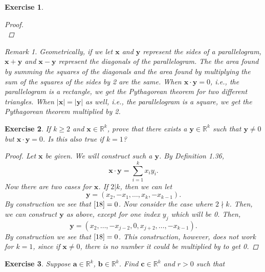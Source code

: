\documentclass[10pt,letterpaper]{amsart}
\newtheorem{exercise}{Exercise}[section]
\theoremstyle{definition}
\theoremstyle{remark}
\newtheorem*{remark}{Remark}
\numberwithin{equation}{exercise}
\begin{document}
\begin{multicols}{2}
\begin{exercise}
\begin{proof}
\begin{equation*}
      \end{equation*}
    \end{proof}
    \begin{remark}
      Geometrically, if we let $\mathbf{x}$ and $\mathbf{y}$ represent the sides of a parallelogram, $\mathbf{x}+\mathbf{y}$ and $\mathbf{x}-\mathbf{y}$ represent the diagonals of the parallelogram. The the area found by summing the squares of the diagonals and the area found by multiplying the sum of the squares of the sides by 2 are the same. When $\mathbf{x}\cdot\mathbf{y} = 0$, i.e., the parallelogram is a rectangle, we get the Pythagorean theorem for two different triangles. When $|\mathbf{x}| = |\mathbf{y}|$ as well, i.e., the parallelogram is a square, we get the Pythagorean theorem multiplied by 2.
    \end{remark}
  \end{exercise}
  \begin{exercise}\label{1.18}
    If $k \ge 2$ and $\mathbf{x} \in \mathbb{R}^k$, prove that there exists a $\mathbf{y} \in \mathbb{R}^k$ such that $\mathbf{y} \ne 0$ but $\mathbf{x}\cdot\mathbf{y} = 0$. Is this also true if $k = 1$?
    \begin{proof}
      Let $\mathbf{x}$ be given. We will construct such a $\mathbf{y}$. By Definition 1.36,
      \begin{equation}\label{18}
        \mathbf{x}\cdot\mathbf{y} = \sum_{i=1}^k x_iy_i.
      \end{equation}
      Now there are two cases for $\mathbf{x}$. If $2|k$, then we can let
      \begin{equation*}
        \mathbf{y} = (x_2,-x_1,\ldots,x_k,-x_{k-1}).
      \end{equation*}
      By construction we see that $\eqref{18} = 0$. Now consider the case where $2\nmid k$. Then, we can construct $\mathbf{y}$ as above, except for one index $y_j$ which will be 0. Then,
      \begin{equation*}
        \mathbf{y} = (x_2,\ldots,-x_{j-2},0,x_{j+2},\ldots,-x_{k-1}).
      \end{equation*}
      By construction we see that $\eqref{18} = 0$. This construction, however, does not work for $k = 1$, since if $\mathbf{x} \ne 0$, there is no number it could be multiplied by to get 0.
    \end{proof}
  \end{exercise}
  \begin{exercise}\label{1.19}
    Suppose $\mathbf{a} \in \mathbb{R}^k$, $\mathbf{b} \in \mathbb{R}^k$. Find $\mathbf{c} \in \mathbb{R}^k$ and $r > 0$ such that

\end{exercise}
\end{multicols}
\end{document}
